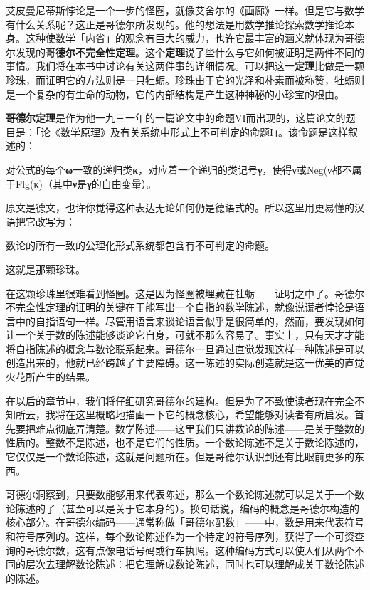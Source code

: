 \documentclass[
  12pt,
  twoside,
  openright,
  oldfontcommands,
]{memoir}
\newcommand{\heititext}[1]{{\heifamily\bfseries #1}}
\newcommand{\westerntext}[1]{{\rmfamily #1}}
\newenvironment{fsquote}{%
  \begin{mdframed}[style=gebquote]\kaitifamily\small%
}{%
  \end{mdframed}%
}
\begin{document}
艾皮曼尼蒂斯悖论是一个一步的怪圈，就像艾舍尔的《画廊》一样。但是它与数学有什么关系呢？这正是哥德尔所发现的。他的想法是用数学推论探索数学推论本身。这种使数学「内省」的观念有巨大的威力，也许它最丰富的涵义就体现为哥德尔发现的\heititext{哥德尔不完全性定理}。这个\heititext{定理}说了些什么与它如何被证明是两件不同的事情。我们将在本书中讨论有关这两件事的详细情况。可以把这一\heititext{定理}比做是一颗珍珠，而证明它的方法则是一只牡蛎。珍珠由于它的光泽和朴素而被称赞，牡蛎则是一个复杂的有生命的动物，它的内部结构是产生这种神秘的小珍宝的根由。

\heititext{哥德尔定理}是作为他一九三一年的一篇论文中的命题VI而出现的，这篇论文的题目是：「论《数学原理》及有关系统中形式上不可判定的命题I」。该命题是这样叙述的：

对公式的每个\textbf{ω}一致的递归类\textbf{κ}，对应着一个递归的类记号\textbf{γ}，使得\westerntext{ν}或\westerntext{Neg(ν}都不属于\westerntext{Flg(κ)}（其中\textbf{ν}是\textbf{γ}的自由变量）。

原文是德文，也许你觉得这种表达无论如何仍是德语式的。所以这里用更易懂的汉语把它改写为：

\begin{fsquote}
数论的所有一致的公理化形式系统都包含有不可判定的命题。
\end{fsquote}

这就是那颗珍珠。

在这颗珍珠里很难看到怪圈。这是因为怪圈被埋藏在牡蛎------证明之中了。哥德尔不完全性定理的证明的关键在于能写出一个自指的数学陈述，就像说谎者悖论是语言中的自指语句一样。尽管用语言来谈论语言似乎是很简单的，然而，要发现如何让一个关于数的陈述能够谈论它自身，可就不那么容易了。事实上，只有天才才能将自指陈述的概念与数论联系起来。哥德尔一旦通过直觉发现这样一种陈述是可以创造出来的，他就已经跨越了主要障碍。这一陈述的实际创造就是这一优美的直觉火花所产生的结果。

在以后的章节中，我们将仔细研究哥德尔的建构。但是为了不致使读者现在完全不知所云，我将在这里概略地描画一下它的概念核心，希望能够对读者有所启发。首先要把难点彻底弄清楚。数学陈述------这里我们只讲数论的陈述------是关于整数的性质的。整数不是陈述，也不是它们的性质。一个数论陈述不是关于数论陈述的，它仅仅是一个数论陈述，这就是问题所在。但是哥德尔认识到还有比眼前更多的东西。

哥德尔洞察到，只要数能够用来代表陈述，那么一个数论陈述就可以是关于一个数论陈述的了（甚至可以是关于它本身的）。换句话说，编码的概念是哥德尔构造的核心部分。在哥德尔编码------通常称做「哥德尔配数」------中，数是用来代表符号和符号序列的。这样，每个数论陈述作为一个特定的符号序列，获得了一个可资查询的哥德尔数，这有点像电话号码或行车执照。这种编码方式可以使人们从两个不同的层次去理解数论陈述：把它理解成数论陈述，同时也可以理解成关于数论陈述的陈述。
\end{document}
